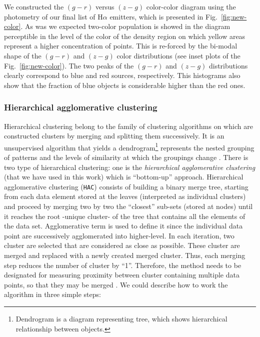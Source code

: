 \documentclass[fleqn,usenatbib]{mnras}
\begin{document}
We constructed the $(g - r)$ versus $(z - g)$ color-color diagram using the photometry of
our final list of H{$\alpha$} emitters, which is presented in Fig.~\ref{fig:new-color}.
As was we expected two-color population is showed in the diagram perceptible in the level of the
color of the density region on which yellow areas represent a higher concentration of points.
This is re-forced by the bi-modal shape of the $(g - r)$ and $(z - g)$ color distributions (see inset plots of the Fig.~\ref{fig:new-color}). The two peaks of the $(g - r)$ and $(z - g)$
distributions clearly correspond to blue and red sources, respectively. This histograms also
show that the fraction of blue objects is considerable higher than the red ones.

\subsubsection{Hierarchical agglomerative clustering}
\label{sec:Hierar}

Hierarchical clustering belong to the family of clustering algorithms
on which are constructed clusters by merging and splitting them successively.
It is an unsupervised algorithm that yields a dendrogram\footnote{Dendrogram is
a diagram representing tree, which shows hierarchical relationship between objects.}
represents the nested grouping of patterns and the levels of similarity
at which the groupings change \citep{Jain:1999}. There is two type of hierarchical
clustering: one is the \textit{hierarchical agglomerative clustering} (that we have
used in this work) which is ``bottom-up'' approach. Hierarchical agglomerative
clustering (\texttt{HAC}) consists of building a binary merge tree, starting from 
each data element stored at the leaves (interpreted as individual clusters)
and proceed by merging two by two the ``closest'' sub-sets (stored at nodes)
until it reaches the root -unique cluster- of the tree that contains all the elements
of the data set. Agglomerative term is used  to define it since the individual data
point are successively agglomerated into higher-level. In each  iteration, two cluster
are selected that are considered as close as possible. These cluster are merged and
replaced with a newly created merged cluster. Thus, each merging step reduces
the number of cluster by ``1''. Therefore, the method needs to be designated for
measuring proximity between cluster containing multiple data points, so that
they may be merged \citep{Mann:2013, Aggarwal:2015}. We could describe how to
work the algorithm in three simple steps:
\end{document}
